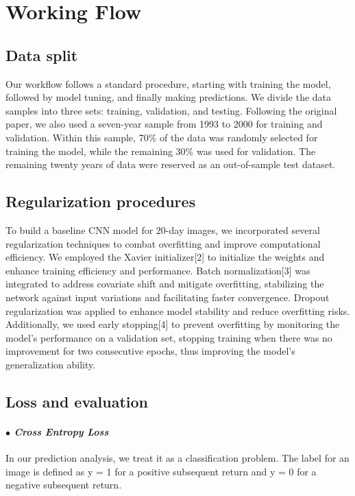 \documentclass{article}
\begin{document}
\section{Working Flow}

\subsection{Data split}
Our workflow follows a standard procedure, starting with training the model, followed by model tuning, and finally making predictions. We divide the data samples into three sets: training, validation, and testing. Following the original paper, we also used a seven-year sample from 1993 to 2000 for training and validation. Within this sample, 70\% of the data was randomly selected for training the model, while the remaining 30\% was used for validation. The remaining twenty years of data were reserved as an out-of-sample test dataset.

\subsection{Regularization procedures}
To build a baseline CNN model for 20-day images, we incorporated several regularization techniques to combat overfitting and improve computational efficiency. We employed the Xavier initializer[2] to initialize the weights and enhance training efficiency and performance. Batch normalization[3] was integrated to address covariate shift and mitigate overfitting, stabilizing the network against input variations and facilitating faster convergence. Dropout regularization was applied to enhance model stability and reduce overfitting risks. Additionally, we used early stopping[4] to prevent overfitting by monitoring the model's performance on a validation set, stopping training when there was no improvement for two consecutive epochs, thus improving the model's generalization ability.

\subsection{Loss and evaluation}
\paragraph{$\bullet$ \emph {Cross Entropy Loss}}
In our prediction analysis, we treat it as a classification problem. The label for an image is defined as y = 1 for a positive subsequent return and y = 0 for a negative subsequent return.
\end{document}
